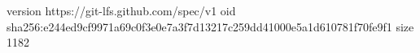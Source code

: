 version https://git-lfs.github.com/spec/v1
oid sha256:e244ed9cf9971a69c0f3e0e7a3f7d13217c259dd41000e5a1d610781f70fe9f1
size 1182
